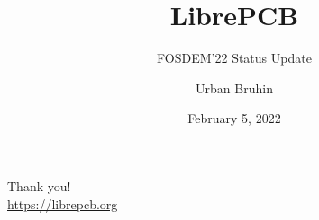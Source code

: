 \documentclass[aspectratio=169,t,notes]{beamer}
\title{LibrePCB}
\subtitle{FOSDEM'22 Status Update}
\date{February 5, 2022} %
\author{Urban Bruhin}
\institute{}
\begin{document}

\maketitle





%


%
%
%
%

%
%
%

%
%
%

%

%
%







%

%

%
%






{
\begin{frame}[standout]
	\begin{centering}
	{\Huge Thank you!}\\
	{\normalsize \url{https://librepcb.org}}\\
	\end{centering}
\end{frame}
}


%
%
%
%
%
%

\end{document}

